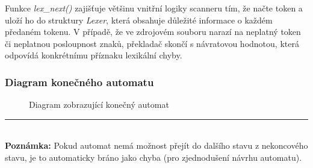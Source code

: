 \documentclass[a4paper, 12pt]{article} %
\begin{document}
            Funkce \textit{lex\_next()} zajišťuje většinu vnitřní logiky scanneru tím, že načte
            token a uloží ho do struktury \textit{Lexer}, která obsahuje důležité informace o každém
            předaném tokenu. V případě, že ve zdrojovém souboru narazí na neplatný token či neplatnou
            posloupnost znaků, překladač skončí s návratovou hodnotou, která odpovídá konkrétnímu
            příznaku lexikální chyby.


            \newpage
            \subsubsection{Diagram konečného automatu}\label{kodiagram}
                \begin{figure}[H]
                    \centering
                    \caption{Diagram zobrazující konečný automat}
                \end{figure}

                \rule{5cm}{0.4pt} \\
                {\footnotesize \textbf{Poznámka:} Pokud automat nemá možnost přejít do dalšího stavu z
                nekoncového stavu, je to automaticky bráno jako chyba (pro zjednodušení návrhu
                automatu).}
            \newpage
\end{document}
